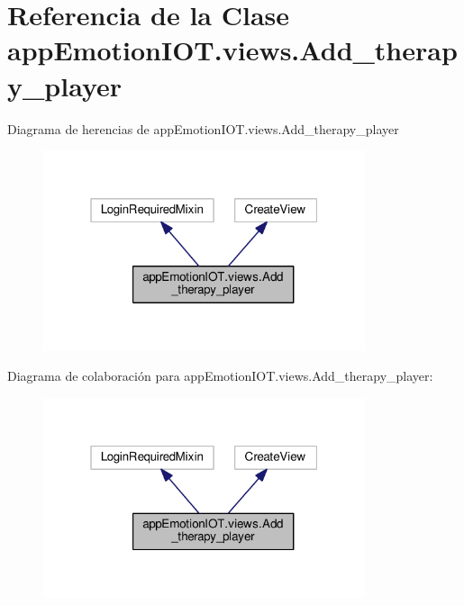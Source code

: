 \hypertarget{classappEmotionIOT_1_1views_1_1Add__therapy__player}{}\section{Referencia de la Clase app\+Emotion\+I\+O\+T.\+views.\+Add\+\_\+therapy\+\_\+player}
\label{classappEmotionIOT_1_1views_1_1Add__therapy__player}


Diagrama de herencias de app\+Emotion\+I\+O\+T.\+views.\+Add\+\_\+therapy\+\_\+player
\nopagebreak
\begin{figure}[H]
\begin{center}
\leavevmode
\includegraphics[width=268pt]{classappEmotionIOT_1_1views_1_1Add__therapy__player__inherit__graph}
\end{center}
\end{figure}


Diagrama de colaboración para app\+Emotion\+I\+O\+T.\+views.\+Add\+\_\+therapy\+\_\+player\+:
\nopagebreak
\begin{figure}[H]
\begin{center}
\leavevmode
\includegraphics[width=268pt]{classappEmotionIOT_1_1views_1_1Add__therapy__player__coll__graph}
\end{center}
\end{figure}
